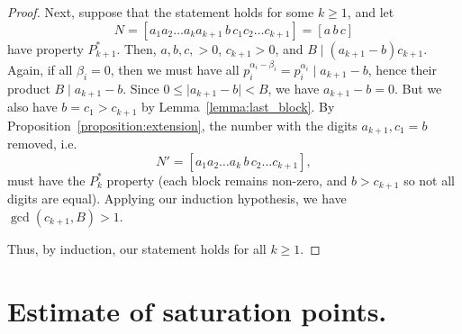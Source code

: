 \documentclass[sn-mathphys]{sn-jnl}%
\theoremstyle{thmstyleone}%
\newtheorem{lemma}[theorem]{Lemma}
\theoremstyle{thmstyletwo}%
\theoremstyle{thmstylethree}%
\begin{document}
\begin{appendices}
\begin{proof}
    Next, suppose that the statement holds for some $k \geq 1$, and let \[
        N = [a_1a_2\dots a_k a_{k + 1} \,b\, c_1c_2\dots c_{k + 1}] =
        [a\,b\,c]
    \] have property $P^*_{k + 1}$. Then, $a, b, c, > 0$, $c_{k + 1} > 0$,
    and $B \mid (a_{k + 1} - b)c_{k + 1}$. Again, if all $\beta_i = 0$,
    then we must have all $p_i^{\alpha_i - \beta_i} = p_i^{\alpha_i} \mid a_{k + 1} - b$,
    hence their product $B \mid a_{k + 1} - b$.
    Since $0 \leq \vert a_{k + 1} - b \vert < B$, we have $a_{k + 1} - b = 0$. But we also have
    $b = c_1 > c_{k + 1}$ by Lemma~\ref{lemma:last_block}.
    By Proposition~\ref{proposition:extension}, the number with the digits $a_{k + 1}, 
    c_1 = b$ removed, i.e.\ \[
        N' = [a_1a_2\dots a_k\, b\, c_2\dots c_{k + 1}],
    \] must have the $P^*_k$ property (each block remains non-zero, and $b > 
    c_{k + 1}$ so not all digits are equal). Applying our induction hypothesis, we have 
    $\gcd(c_{k + 1}, B) > 1$.

    Thus, by induction, our statement holds for all $k \geq 1$.
\end{proof}


\section{Estimate of saturation points.} \label{section:estimate_saturation}



\end{appendices}
\end{document}

